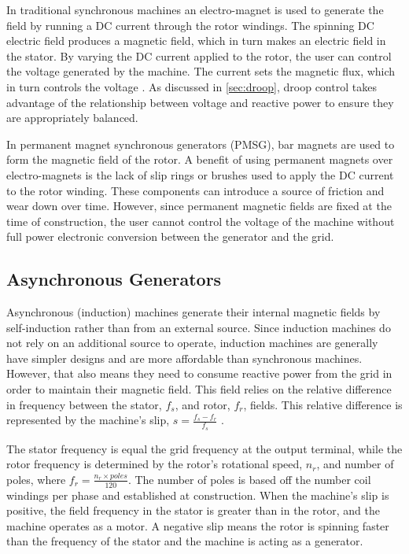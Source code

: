 In traditional synchronous machines an electro-magnet is used to generate the field by running a DC current through the rotor windings. The spinning DC electric field produces a magnetic field, which in turn makes an electric field in the stator. By varying the DC current applied to the rotor, the user can control the voltage generated by the machine. The current sets the magnetic flux, which in turn controls the voltage \cite{Chapman2005}. As discussed in \autoref{sec:droop}, droop control takes advantage of the relationship between voltage and reactive power to ensure they are appropriately balanced.

In permanent magnet synchronous generators (PMSG), bar magnets are used to form the magnetic field of the rotor. A benefit of using permanent magnets over electro-magnets is the lack of slip rings or brushes used to apply the DC current to the rotor winding. These components can introduce a source of friction and wear down over time. However, since permanent magnetic fields are fixed at the time of construction, the user cannot control the voltage of the machine without full power electronic conversion between the generator and the grid.

\subsection{Asynchronous Generators}
Asynchronous (induction) machines generate their internal magnetic fields by self-induction rather than from an external source. Since induction machines do not rely on an additional source to operate, induction machines are generally have simpler designs and are more affordable than synchronous machines. However, that also means they need to consume reactive power from the grid in order to maintain their magnetic field. This field relies on the relative difference in frequency between the stator, $f_{s}$, and rotor, $f_{r}$, fields. This relative difference is represented by the machine's slip, $s = \frac{f_{s} - f_{r}}{f_{s}}$ \cite{Chapman2005}.

The stator frequency is equal the grid frequency at the output terminal, while the rotor frequency is determined by the rotor's rotational speed, $n_r$, and number of poles, where $f_r = \frac{n_r \times poles}{120}$. The number of poles is based off the number coil windings per phase and established at construction. When the machine's slip is positive, the field frequency in the stator is greater than in the rotor, and the machine operates as a motor. A negative slip means the rotor is spinning faster than the frequency of the stator and the machine is acting as a generator. 


